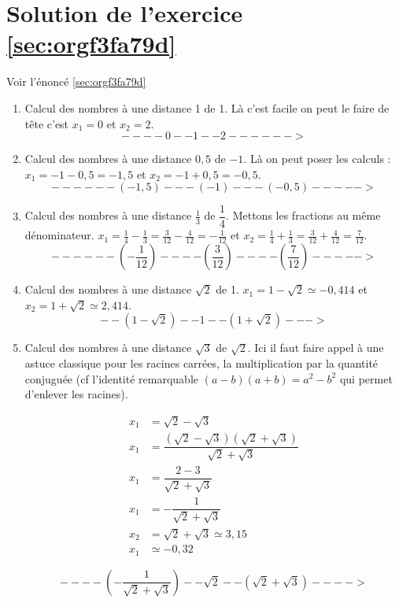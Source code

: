 \documentclass[a4paper, 11pt, twoside]{book}
\begin{document}
\section{Solution de l'exercice \ref{sec:orgf3fa79d}}
\label{sec:orge2c9b43}
Voir l'énoncé \ref{sec:orgf3fa79d}

\begin{enumerate}
\item Calcul des nombres à une distance 1 de 1. Là c'est facile on
peut le faire de tête c'est \(x_1 = 0\) et \(x_2 = 2\).
\[----0--1--2------>\]
\item Calcul des nombres à une distance \(0,5\) de \(-1\). Là on peut
poser les calculs : \(x_1 = -1 - 0,5 = -1,5\) et \(x_2 = -1 + 0,5 =
       -0,5\).
\[------(-1,5)---(-1)---(-0,5)----->\]
\item Calcul des nombres à une distance \(\frac{1}{3}\) de
\(\dfrac{1}{4}\). Mettons les fractions au même
dénominateur. \(x_1 = \frac{1}{4} - \frac{1}{3} = \frac{3}{12} -
       \frac{4}{12} = -\frac{1}{12}\) et \(x_2 = \frac{1}{4} +
       \frac{1}{3} = \frac{3}{12} + \frac{4}{12} = \frac{7}{12}\).
\[------\left(-\frac{1}{12}\right)----\left(\frac{3}{12}\right)----\left(\frac{7}{12}\right)----->\]

\item Calcul des nombres à une distance \(\sqrt{2}\) de 1. \(x_1 = 1 -
       \sqrt{2}\simeq -0,414\) et \(x_2 = 1 + \sqrt{2} \simeq 2,414\).
\[--(1-\sqrt{2})--1--(1+\sqrt{2})--->\]

\item Calcul des nombres à une distance \(\sqrt{3}\) de \(\sqrt{2}\). Ici
il faut faire appel à une astuce classique pour les racines
carrées, la multiplication par la quantité conjuguée (cf
l'identité remarquable \((a - b)(a + b) = a^2 - b^2\) qui permet
d'enlever les racines).

\begin{align*}
x_1 &= \sqrt{2} - \sqrt{3} \\
x_1 &= \dfrac{(\sqrt{2} - \sqrt{3})(\sqrt{2} + \sqrt{3})}{\sqrt{2} + \sqrt{3}} \\
x_1 &= \dfrac{2 - 3}{\sqrt{2} + \sqrt{3}} \\
x_1 &= -\dfrac{1}{\sqrt{2} + \sqrt{3}} \\
x_2 &= \sqrt{2} + \sqrt{3}\simeq 3,15 \\
x_1 &\simeq -0,32
\end{align*}

\[----\left(-\dfrac{1}{\sqrt{2} + \sqrt{3}}\right)--\sqrt{2}--(\sqrt{2} + \sqrt{3})---->\]


\end{enumerate}
\end{document}
